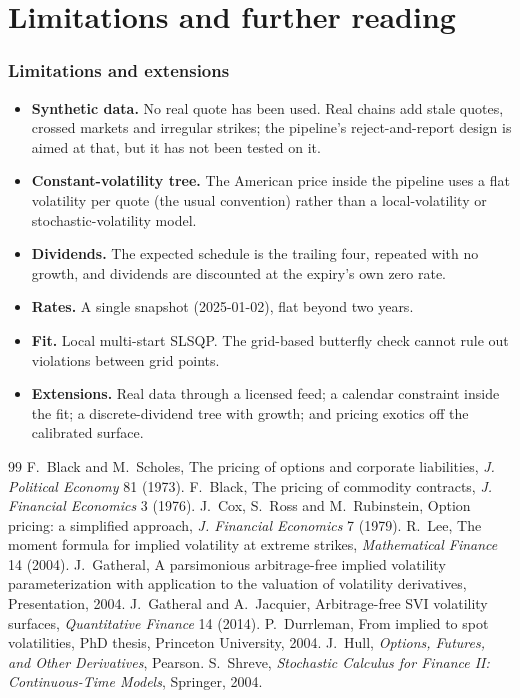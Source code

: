 \documentclass[11pt]{article}
\begin{document}
\part{Limitations and further reading}

\section{Limitations and extensions}

\begin{itemize}
  \item \textbf{Synthetic data.} No real quote has been used. Real chains add
        stale quotes, crossed markets and irregular strikes; the pipeline's
        reject-and-report design is aimed at that, but it has not been tested on
        it.
  \item \textbf{Constant-volatility tree.} The American price inside the pipeline
        uses a flat volatility per quote (the usual convention) rather than a
        local-volatility or stochastic-volatility model.
  \item \textbf{Dividends.} The expected schedule is the trailing four, repeated
        with no growth, and dividends are discounted at the expiry's own zero
        rate.
  \item \textbf{Rates.} A single snapshot (2025-01-02), flat beyond two years.
  \item \textbf{Fit.} Local multi-start SLSQP. The grid-based butterfly check
        cannot rule out violations between grid points.
  \item \textbf{Extensions.} Real data through a licensed feed; a calendar
        constraint inside the fit; a discrete-dividend tree with growth; and
        pricing exotics off the calibrated surface.
\end{itemize}

\begin{thebibliography}{99}
 F.~Black and M.~Scholes, The pricing of options and corporate
liabilities, \emph{J. Political Economy} 81 (1973).
 F.~Black, The pricing of commodity contracts, \emph{J. Financial
Economics} 3 (1976).
 J.~Cox, S.~Ross and M.~Rubinstein, Option pricing: a simplified
approach, \emph{J. Financial Economics} 7 (1979).
 R.~Lee, The moment formula for implied volatility at extreme
strikes, \emph{Mathematical Finance} 14 (2004).
 J.~Gatheral, A parsimonious arbitrage-free implied volatility
parameterization with application to the valuation of volatility derivatives,
Presentation, 2004.
 J.~Gatheral and A.~Jacquier, Arbitrage-free SVI volatility
surfaces, \emph{Quantitative Finance} 14 (2014).
 P.~Durrleman, From implied to spot volatilities, PhD thesis,
Princeton University, 2004.
 J.~Hull, \emph{Options, Futures, and Other Derivatives}, Pearson.
 S.~Shreve, \emph{Stochastic Calculus for Finance II:
Continuous-Time Models}, Springer, 2004.
\end{thebibliography}
\end{document}
